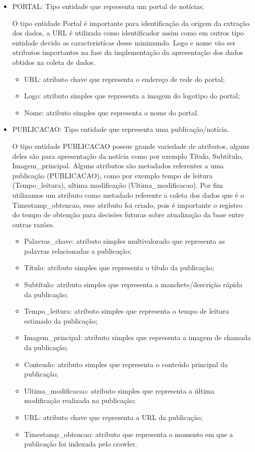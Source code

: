 \begin{itemize}

				\item PORTAL: Tipo entidade que representa um portal de notícias;

								O tipo entidade Portal é importante para identificação da origem da extração dos dados, a URL é utilizada como identificador assim como em outros tipo entidade devido as caracteristícas desse minimundo. Logo e nome vão ser atributos importantes na fase da implementação da apresentação dos dados obtidos na coleta de dados.
\begin{itemize}
\item URL: atributo chave que representa o endereço de rede do portal;
\item Logo: atributo simples que representa a imagem do logotipo do portal;
\item Nome: atributo simples que representa o nome do portal.
\end{itemize}
\end{itemize}
\begin{itemize}
\item PUBLICACAO: Tipo entidade que representa uma publicação/notícia.

				O tipo entidade PUBLICACAO possue grande variedade de atributos, alguns deles são para apresentação da notícia como por exemplo Título, Subtítulo, Imagem\_principal. Alguns atributos são metadados referentes a uma publicação (PUBLICACAO), como por exemplo tempo de leitura (Tempo\_leitura), ultima modificação (Ultima\_modificacao). Por fim utilizamos um atributo como metadado referente a coleta dos dados que é o Timestamp\_obtencao, esse atributo foi criado, pois é importante o registro do tempo de obtenção para decisões futuras sobre atualização da base entre outras razões.
\begin{itemize}
\item Palavras\_chave: atributo simples multivalorado que representa as palavras relacionadas a publicação;
\item Título: atributo simples que representa o título da publicação;
\item Subtítulo: atributo simples que representa a manchete/descrição rápida da publicação;
\item Tempo\_leitura: atributo simples que representa o tempo de leitura estimado da publicação;
\item Imagem\_principal: atributo simples que representa a imagem de chamada da publicação;
\item Conteudo: atributo simples que representa o conteúdo principal da publicação;
\item Ultima\_modificacao: atributo simples que representa a última modificação realizada na publicação;
\item URL: atributo chave que representa a URL da publicação;
\item Timestamp\_obtencao: atributo que representa o momento em que a publicação foi indexada pelo crawler.

\end{itemize}
\end{itemize}
